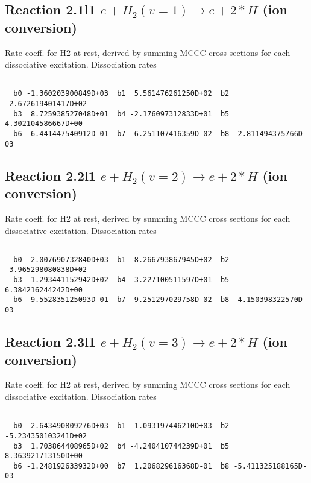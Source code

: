 \newpage
\subsection{
Reaction 2.1l1
$ e + H_2(v=1) \rightarrow e + 2*H $ (ion conversion)
}
Rate coeff. for H2 at rest, derived by summing MCCC cross sections for each dissociative excitation.
Dissociation rates 

\begin{small}\begin{verbatim}

  b0 -1.360203900849D+03  b1  5.561476261250D+02  b2 -2.672619401417D+02
  b3  8.725938527048D+01  b4 -2.176097312833D+01  b5  4.302104586667D+00
  b6 -6.441447540912D-01  b7  6.251107416359D-02  b8 -2.811494375766D-03

\end{verbatim}\end{small}

\newpage
\subsection{
Reaction 2.2l1
$ e + H_2(v=2) \rightarrow e + 2*H $ (ion conversion)
}
Rate coeff. for H2 at rest, derived by summing MCCC cross sections for each dissociative excitation.
Dissociation rates 

\begin{small}\begin{verbatim}

  b0 -2.007690732840D+03  b1  8.266793867945D+02  b2 -3.965298080838D+02
  b3  1.293441152942D+02  b4 -3.227100511597D+01  b5  6.384216244242D+00
  b6 -9.552835125093D-01  b7  9.251297029758D-02  b8 -4.150398322570D-03

\end{verbatim}\end{small}

\newpage
\subsection{
Reaction 2.3l1
$ e + H_2(v=3) \rightarrow e + 2*H $ (ion conversion)
}
Rate coeff. for H2 at rest, derived by summing MCCC cross sections for each dissociative excitation.
Dissociation rates 

\begin{small}\begin{verbatim}

  b0 -2.643490809276D+03  b1  1.093197446210D+03  b2 -5.234350103241D+02
  b3  1.703864408965D+02  b4 -4.240410744239D+01  b5  8.363921713150D+00
  b6 -1.248192633932D+00  b7  1.206829616368D-01  b8 -5.411325188165D-03

\end{verbatim}\end{small}

